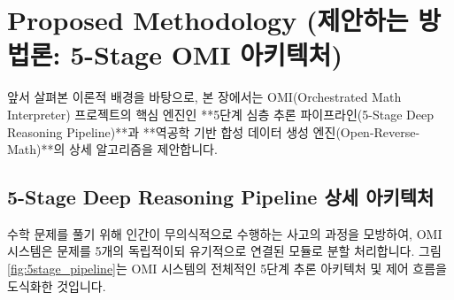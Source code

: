 \section{Proposed Methodology (제안하는 방법론: 5-Stage OMI 아키텍처)}

앞서 살펴본 이론적 배경을 바탕으로, 본 장에서는 OMI(Orchestrated Math Interpreter) 프로젝트의 핵심 엔진인 **5단계 심층 추론 파이프라인(5-Stage Deep Reasoning Pipeline)**과 **역공학 기반 합성 데이터 생성 엔진(Open-Reverse-Math)**의 상세 알고리즘을 제안합니다.

\subsection{5-Stage Deep Reasoning Pipeline 상세 아키텍처}
수학 문제를 풀기 위해 인간이 무의식적으로 수행하는 사고의 과정을 모방하여, OMI 시스템은 문제를 5개의 독립적이되 유기적으로 연결된 모듈로 분할 처리합니다. 그림 \ref{fig:5stage_pipeline}는 OMI 시스템의 전체적인 5단계 추론 아키텍처 및 제어 흐름을 도식화한 것입니다.

